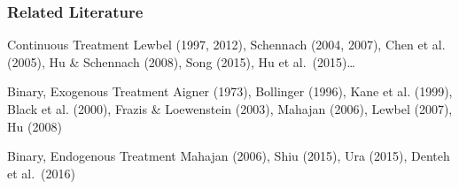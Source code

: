 \documentclass{beamer}
\begin{document}
%   
\begin{frame}[label=MAHAJAN_BODY]
  \frametitle{Related Literature}
 
  \begin{block}{Continuous Treatment}
    \small
  Lewbel (1997, 2012), Schennach (2004, 2007), Chen et al. (2005), Hu \& Schennach (2008), Song (2015), Hu et al.\ (2015)\ldots 
  \end{block}

  \begin{block}{Binary, Exogenous Treatment}
    \small
   Aigner (1973), Bollinger (1996), Kane et al. (1999), Black et al. (2000), Frazis \& Loewenstein (2003), Mahajan (2006), Lewbel (2007), Hu (2008)
  \end{block}

  \begin{block}{Binary, Endogenous Treatment}
    \alert{Mahajan (2006)}, \small Shiu (2015), Ura (2015), Denteh et al.\ (2016)  
  \end{block}
\end{frame}
\end{document}
